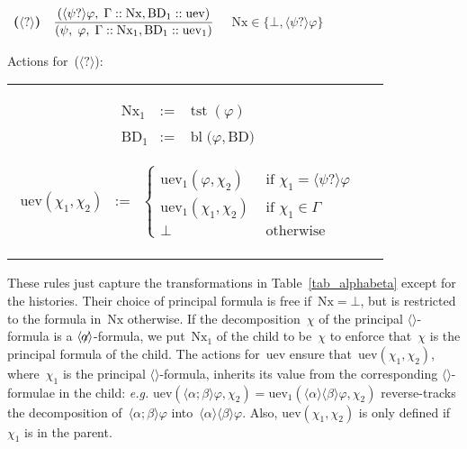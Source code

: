 \documentclass{entcs}
\newcommand{\eg}{\emph{e.g.}}
\newcommand{\pea}[2]{\langle#1\rangle #2}
\newcommand{\psp}[2]{#1;#2}
\newcommand{\pip}[1]{#1?}
\newcommand{\fea}{$\pea{}{}$}
\newcommand{\fean}{$\pea{\not\!\!a}{}$}
\newcommand{\tnode}[3]{(#1 :: #2 :: #3)}
\newcommand{\tnext}{\mathrm{Nx}}
\newcommand{\tbdia}{\mathrm{BD}}
\newcommand{\tuev}{\mathrm{uev}}
\newcommand{\trei}{$\pea{\pip{}}{}$}
\newcommand{\tfean}{\mathop{\mathrm{tst}}}
\newcommand{\tbl}{\mathop{\mathrm{bl}}}
\newcommand{\ds}{\displaystyle\strut}
\newcommand{\ruleone}[3]{
\mbox{ {\bf #1} \ $\frac{\ds \mbox{$#2$}}{\ds \mbox{$#3$}}$}}
\begin{document}
\begin{center}
  \ruleone{(\trei{})}
  {\tnode{\pea{\pip{\psi}}{\varphi} , \; \Gamma}{\tnext, \tbdia_1}{\tuev}}
  {\tnode{\psi , \; \varphi , \; \Gamma}{\tnext_1, \tbdia_1}{\tuev_1}}
  $\quad \tnext \in \{ \bot, \pea{\pip{\psi}}{\varphi} \}$
  \\[1em]
\end{center}
\begin{flushleft}
  Actions for~(\trei{}): \ \\
  \begin{tabular}[c]{lr}
    \begin{minipage}[c]{0.28\linewidth}
      \begin{eqnarray*}
        \tnext_1 & := & \tfean(\varphi)
        \\ \\
        \tbdia_1 & := & \tbl\big( \varphi, \tbdia \big)
      \end{eqnarray*}
    \end{minipage}
    \begin{minipage}[c]{0.72\linewidth}
      \begin{eqnarray*}
        \tuev(\chi_1, \chi_2) & := &
        \left\{
          \begin{array}{ll}
            \tuev_1(\varphi, \chi_2) & \text{ if } \chi_1 = \pea{\pip{\psi}}{\varphi}\\
            \tuev_1(\chi_1, \chi_2) & \text{ if } \chi_1 \in \Gamma\\
            \bot & \text{ otherwise}
          \end{array}
        \right .
      \end{eqnarray*}
    \end{minipage}
  \end{tabular}
\end{flushleft}

These rules just capture the transformations in Table~\ref{tab_alphabeta}
except for the histories.
Their choice of principal formula is free if~$\tnext = \bot$,
but is restricted to the formula in~$\tnext$ otherwise.
If the decomposition~$\chi$ of the principal \fea{}-formula is a \fean{}-formula,
we put~$\tnext_1$ of the child to be~$\chi$ to enforce that~$\chi$ is the principal formula of the child.
The actions for~$\tuev$ ensure
that~$\tuev(\chi_1, \chi_2)$, where~$\chi_1$ is the principal \fea{}-formula,
inherits its value from the corresponding \fea{}-formulae in the child:
\eg{} $\tuev(\pea{\psp{\alpha}{\beta}}{\varphi}, \chi_2) = \tuev_1(\pea{\alpha}{\pea{\beta}{\varphi}}, \chi_2)$
reverse-tracks the decomposition of~$\pea{\psp{\alpha}{\beta}}{\varphi}$ into~$\pea{\alpha}{\pea{\beta}{\varphi}}$.
Also, $\tuev(\chi_1, \chi_2)$ is only defined if~$\chi_1$ is in the parent.
\end{document}
